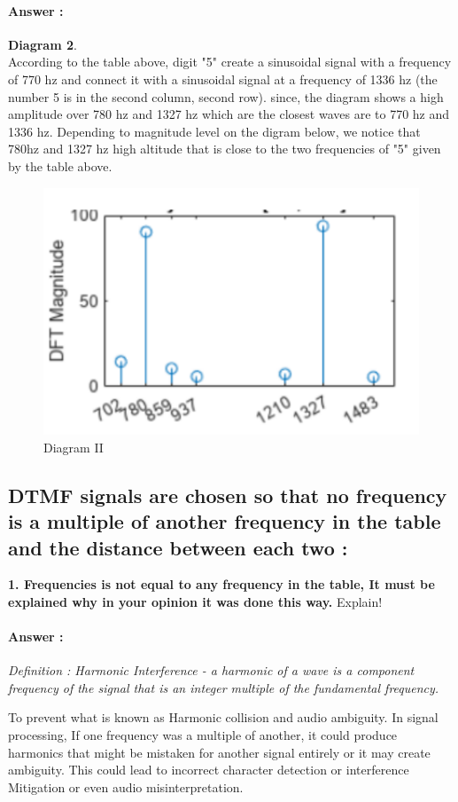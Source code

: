 \documentclass[letterpaper, 12pt]{article}
\begin{document}
\paragraph{Answer :} \textbf{Diagram 2}. \\
According to the table above, digit "5" create a sinusoidal signal with a frequency of 770 hz
and connect it with a sinusoidal signal at a frequency of 1336 hz (the number 5 is in the second column, second row). since, the diagram shows a high amplitude over 780 hz and 1327 hz which are the closest waves are to 770 hz and 1336 hz. Depending to magnitude level on the digram below, we notice that 780hz and 1327 hz high altitude that is close to the two frequencies of "5" given by the table above.
\begin{figure}[htbp ]
    \centering
    \includegraphics[width=0.5\linewidth]{FINAL_ASSIGNMENT/A_A_1.png}
    \caption{Diagram II}
\end{figure}



\subsection{DTMF signals are chosen so that no frequency is a multiple of another frequency in the table and the distance between each two :}

\textbf{1. Frequencies is not equal to any frequency in the table, It must be explained why in your opinion it was done this way.} Explain!

\paragraph{Answer :} 
\textit{Definition : Harmonic Interference - a harmonic of a wave is a component frequency of the signal that is an integer multiple of the fundamental frequency.\\}

To prevent what is known as Harmonic collision and audio ambiguity. In signal processing,  If one frequency was a multiple of another, it could produce harmonics that might be mistaken for another signal entirely or it may create ambiguity. This could lead to incorrect character detection or interference Mitigation or even audio misinterpretation.
\end{document}
